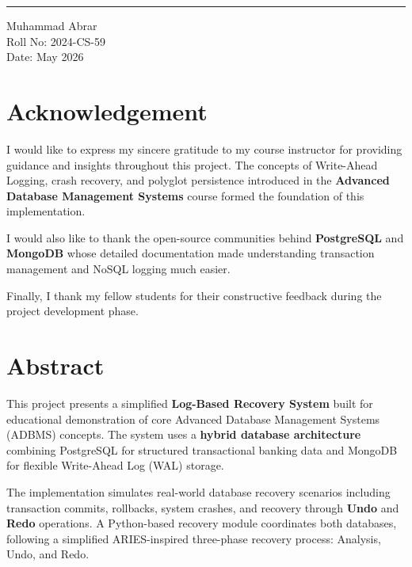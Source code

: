 \documentclass[12pt, a4paper]{report}
\begin{document}
\vspace{2cm}
\begin{flushright}
  \hrule\vspace{0.3cm}
  Muhammad Abrar\\
  Roll No: 2024-CS-59\\
  Date: May 2026
\end{flushright}

\chapter*{Acknowledgement}
\thispagestyle{plain}

I would like to express my sincere gratitude to my course instructor for
providing guidance and insights throughout this project. The concepts of
Write-Ahead Logging, crash recovery, and polyglot persistence introduced in
the \textbf{Advanced Database Management Systems} course formed the foundation
of this implementation.

I would also like to thank the open-source communities behind
\textbf{PostgreSQL} and \textbf{MongoDB} whose detailed documentation made
understanding transaction management and NoSQL logging much easier.

Finally, I thank my fellow students for their constructive feedback during the
project development phase.

\chapter*{Abstract}
\thispagestyle{plain}

This project presents a simplified \textbf{Log-Based Recovery System} built
for educational demonstration of core Advanced Database Management Systems
(ADBMS) concepts. The system uses a \textbf{hybrid database architecture}
combining PostgreSQL for structured transactional banking data and MongoDB for
flexible Write-Ahead Log (WAL) storage.

The implementation simulates real-world database recovery scenarios including
transaction commits, rollbacks, system crashes, and recovery through
\textbf{Undo} and \textbf{Redo} operations. A Python-based recovery module
coordinates both databases, following a simplified ARIES-inspired three-phase
recovery process: Analysis, Undo, and Redo.
\end{document}
